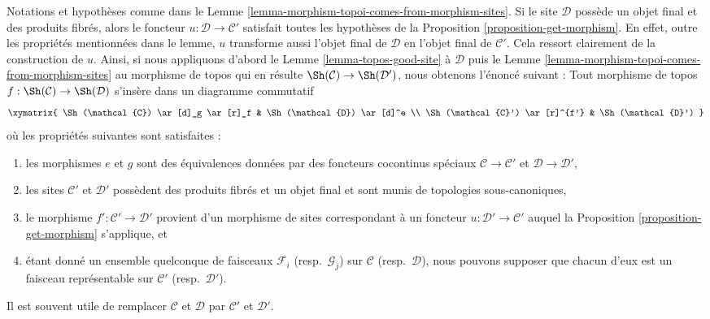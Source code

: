\begin{remark}
\label{remark-morphism-topoi-comes-from-morphism-sites}
Notations et hypothèses
comme dans le Lemme \ref{lemma-morphism-topoi-comes-from-morphism-sites}.
Si le site $\mathcal{D}$ possède un objet final et des produits fibrés,
alors le foncteur $u : \mathcal{D} \to \mathcal{C}'$ satisfait
toutes les hypothèses de la Proposition \ref{proposition-get-morphism}.
En effet, outre les propriétés mentionnées dans le lemme, $u$
transforme aussi l’objet final de $\mathcal{D}$ en l’objet final
de $\mathcal{C}'$. Cela ressort clairement de la construction de $u$.
Ainsi, si nous appliquons d’abord le
Lemme \ref{lemma-topos-good-site}
à $\mathcal{D}$
puis le
Lemme \ref{lemma-morphism-topoi-comes-from-morphism-sites}
au morphisme de topos qui en résulte
$\Sh(\mathcal{C}) \to \Sh(\mathcal{D}')$,
nous obtenons l’énoncé suivant :
Tout morphisme de topos
$f : \Sh(\mathcal{C}) \to \Sh(\mathcal{D})$
s’insère dans un diagramme commutatif
$$
\xymatrix{
\Sh(\mathcal{C}) \ar[d]_g \ar[r]_f &
\Sh(\mathcal{D}) \ar[d]^e \\
\Sh(\mathcal{C}') \ar[r]^{f'} &
\Sh(\mathcal{D}')
}
$$
où les propriétés suivantes sont satisfaites :
\begin{enumerate}
\item les morphismes $e$ et $g$ sont des équivalences données par des
foncteurs cocontinus spéciaux $\mathcal{C} \to \mathcal{C}'$ et
$\mathcal{D} \to \mathcal{D}'$,
\item les sites $\mathcal{C}'$ et $\mathcal{D}'$ possèdent des produits fibrés et un objet
final et sont munis de topologies sous-canoniques,
\item le morphisme $f' : \mathcal{C}' \to \mathcal{D}'$ provient d’un
morphisme de sites correspondant à un foncteur
$u : \mathcal{D}' \to \mathcal{C}'$ auquel la
Proposition \ref{proposition-get-morphism}
s’applique, et
\item étant donné un ensemble quelconque de faisceaux $\mathcal{F}_i$ (resp.\ $\mathcal{G}_j$)
sur $\mathcal{C}$ (resp.\ $\mathcal{D}$), nous pouvons supposer que chacun d’eux est
un faisceau représentable sur $\mathcal{C}'$ (resp.\ $\mathcal{D}'$).
\end{enumerate}
Il est souvent utile de remplacer $\mathcal{C}$ et $\mathcal{D}$ par
$\mathcal{C}'$ et $\mathcal{D}'$.
\end{remark}

